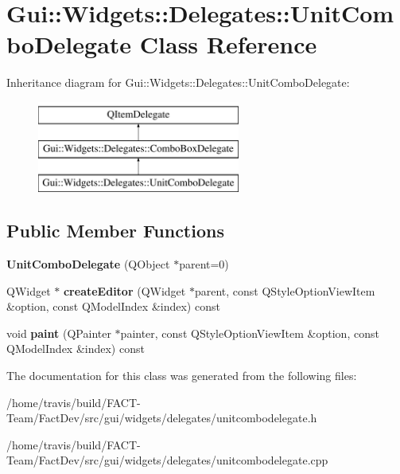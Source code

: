 \hypertarget{classGui_1_1Widgets_1_1Delegates_1_1UnitComboDelegate}{\section{Gui\-:\-:Widgets\-:\-:Delegates\-:\-:Unit\-Combo\-Delegate Class Reference}
\label{classGui_1_1Widgets_1_1Delegates_1_1UnitComboDelegate}
}
Inheritance diagram for Gui\-:\-:Widgets\-:\-:Delegates\-:\-:Unit\-Combo\-Delegate\-:\begin{figure}[H]
\begin{center}
\leavevmode
\includegraphics[height=3.000000cm]{db/def/classGui_1_1Widgets_1_1Delegates_1_1UnitComboDelegate}
\end{center}
\end{figure}
\subsection*{Public Member Functions}
\begin{DoxyCompactItemize}
\item 
\hypertarget{classGui_1_1Widgets_1_1Delegates_1_1UnitComboDelegate_afd1dc5362c4ed8263354e80337d9958a}{{\bfseries Unit\-Combo\-Delegate} (Q\-Object $\ast$parent=0)}\label{classGui_1_1Widgets_1_1Delegates_1_1UnitComboDelegate_afd1dc5362c4ed8263354e80337d9958a}

\item 
\hypertarget{classGui_1_1Widgets_1_1Delegates_1_1UnitComboDelegate_a246f92146bdf89200867629b68e3a86a}{Q\-Widget $\ast$ {\bfseries create\-Editor} (Q\-Widget $\ast$parent, const Q\-Style\-Option\-View\-Item \&option, const Q\-Model\-Index \&index) const }\label{classGui_1_1Widgets_1_1Delegates_1_1UnitComboDelegate_a246f92146bdf89200867629b68e3a86a}

\item 
\hypertarget{classGui_1_1Widgets_1_1Delegates_1_1UnitComboDelegate_a2efed5aa3b9bde3cd80e9518cde00e60}{void {\bfseries paint} (Q\-Painter $\ast$painter, const Q\-Style\-Option\-View\-Item \&option, const Q\-Model\-Index \&index) const }\label{classGui_1_1Widgets_1_1Delegates_1_1UnitComboDelegate_a2efed5aa3b9bde3cd80e9518cde00e60}

\end{DoxyCompactItemize}


The documentation for this class was generated from the following files\-:\begin{DoxyCompactItemize}
\item 
/home/travis/build/\-F\-A\-C\-T-\/\-Team/\-Fact\-Dev/src/gui/widgets/delegates/unitcombodelegate.\-h\item 
/home/travis/build/\-F\-A\-C\-T-\/\-Team/\-Fact\-Dev/src/gui/widgets/delegates/unitcombodelegate.\-cpp\end{DoxyCompactItemize}
